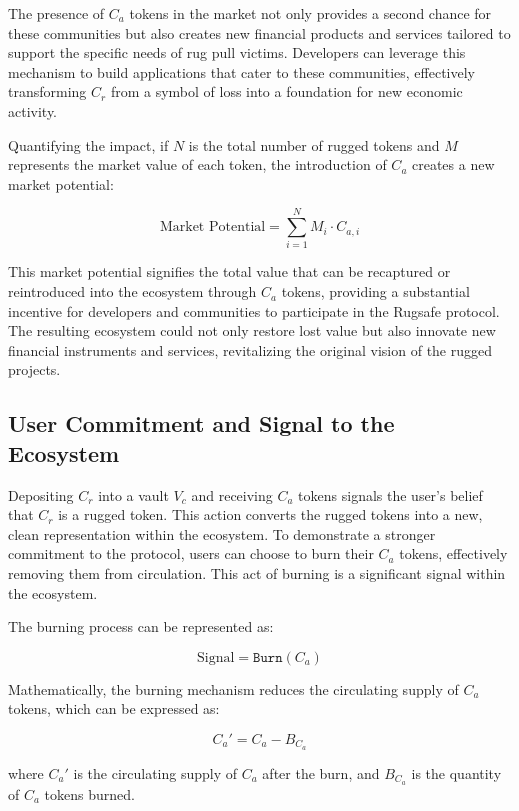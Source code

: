 \documentclass{article}
\begin{document}
The presence of $C_a$ tokens in the market not only provides a second chance for these communities but also creates new financial products and services tailored to support the specific needs of rug pull victims. Developers can leverage this mechanism to build applications that cater to these communities, effectively transforming $C_r$ from a symbol of loss into a foundation for new economic activity.

Quantifying the impact, if $N$ is the total number of rugged tokens and $M$ represents the market value of each token, the introduction of $C_a$ creates a new market potential:

\[
\text{Market Potential} = \sum_{i=1}^{N} M_i \cdot C_{a,i}
\]

This market potential signifies the total value that can be recaptured or reintroduced into the ecosystem through $C_a$ tokens, providing a substantial incentive for developers and communities to participate in the Rugsafe protocol. The resulting ecosystem could not only restore lost value but also innovate new financial instruments and services, revitalizing the original vision of the rugged projects.









\subsection{User Commitment and Signal to the Ecosystem}

Depositing $C_r$ into a vault $V_c$ and receiving $C_a$ tokens signals the user's belief that $C_r$ is a rugged token. This action converts the rugged tokens into a new, clean representation within the ecosystem. To demonstrate a stronger commitment to the protocol, users can choose to burn their $C_a$ tokens, effectively removing them from circulation. This act of burning is a significant signal within the ecosystem.

The burning process can be represented as:

\[
\text{Signal} = \texttt{Burn}(C_a)
\]

Mathematically, the burning mechanism reduces the circulating supply of $C_a$ tokens, which can be expressed as:

\[
C_a' = C_a - B_{C_a}
\]

where \(C_a'\) is the circulating supply of $C_a$ after the burn, and \(B_{C_a}\) is the quantity of $C_a$ tokens burned.
\end{document}

